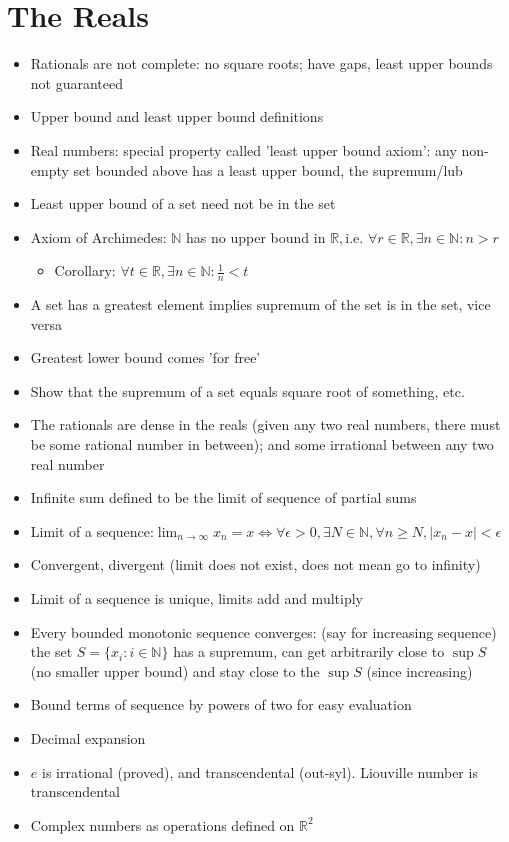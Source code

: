 \section{The Reals}
\begin{itemize}
      \item Rationals are not complete: no square roots; have gaps, least upper
            bounds not guaranteed
      \item Upper bound and least upper bound definitions
      \item Real numbers: special property called 'least upper bound axiom': any
            non-empty set bounded above has a least upper bound, the supremum/lub
      \item Least upper bound of a set need not be in the set
      \item Axiom of Archimedes: $\mathbb{N}$ has no upper bound in $\mathbb{R},$i.e.
            $\forall r\in\mathbb{R},\exists n\in\mathbb{N}:n>r$
            \begin{itemize}
                  \item Corollary: $\forall t\in\mathbb{R},\exists n\in\mathbb{N}:\frac{1}{n}<t$
            \end{itemize}
      \item A set has a greatest element implies supremum of the set is in the
            set, vice versa
      \item Greatest lower bound comes 'for free'
      \item Show that the supremum of a set equals square root of something, etc.
      \item The rationals are dense in the reals (given any two real numbers,
            there must be some rational number in between); and some irrational
            between any two real number
      \item Infinite sum defined to be the limit of sequence of partial sums
      \item Limit of a sequence:${\displaystyle \lim_{n\to\infty}x_{n}=x\iff\forall\epsilon>0,\exists N\in\mathbb{\mathbb{N}},\forall n\geq N,|x_{n}-x|<\epsilon}$
      \item Convergent, divergent (limit does not exist, does not mean go to infinity)
      \item Limit of a sequence is unique, limits add and multiply
      \item Every bounded monotonic sequence converges: (say for increasing sequence)
            the set $S=\{x_{i}:i\in\mathbb{N}\}$ has a supremum, can get arbitrarily
            close to $\sup S$ (no smaller upper bound) and stay close to the
            $\sup S$ (since increasing)
      \item Bound terms of sequence by powers of two for easy evaluation
      \item Decimal expansion
      \item $e$ is irrational (proved), and transcendental (out-syl). Liouville
            number is transcendental
      \item Complex numbers as operations defined on $\mathbb{R}^{2}$
\end{itemize}


